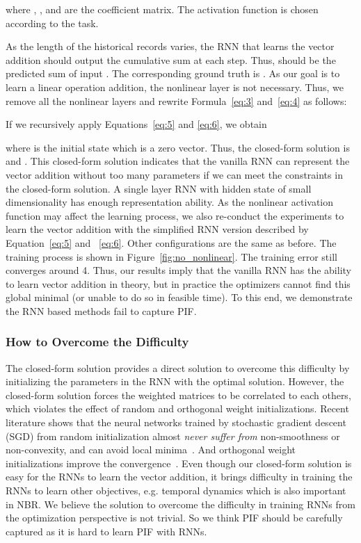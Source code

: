 \documentclass[sigconf]{acmart}
\begin{document}
where , , and  are the coefficient matrix. The activation function  is  chosen according to the task. 

As the length of the historical records varies, the RNN that learns the  vector addition should  output the cumulative sum at each step. Thus,  should be the predicted sum of input . The corresponding ground truth is .
As our goal is to learn a linear operation addition, the nonlinear layer is not necessary. Thus, we remove all the nonlinear layers and rewrite Formula~\ref{eq:3} and~\ref{eq:4} as follows:


If we recursively apply Equations~\ref{eq:5} and \ref{eq:6}, we obtain  


where  is the initial state which is a zero vector. Thus, the closed-form solution is  and . This closed-form solution indicates that the vanilla RNN can  represent the vector addition without too many parameters if we can meet the constraints in the closed-form solution. A single layer RNN with  hidden state of small dimensionality has  enough representation ability. As the  nonlinear activation function may affect the learning process, we also  re-conduct the  experiments to learn the vector addition with the simplified RNN version described by Equation~\ref{eq:5} and ~\ref{eq:6}. Other configurations are the same as before. The training process is shown in  Figure~\ref{fig:no_nonlinear}. The training error  still converges around 4.   Thus, our results imply that the vanilla RNN has the ability to learn vector addition in theory,  but in practice the optimizers  cannot find this global minimal (or unable to do so in feasible time). To this end, we demonstrate the RNN based methods fail to capture PIF.  



\subsubsection{How to Overcome the Difficulty}
The closed-form solution provides a direct solution to overcome this difficulty by initializing the parameters in the RNN with the optimal solution. However, the closed-form solution forces the  weighted matrices to be  correlated to each others,  which violates the effect of random and orthogonal weight initializations.  Recent literature shows that the neural networks trained by stochastic gradient descent (SGD) from random  initialization almost \textit{never suffer from} non-smoothness or non-convexity, and can avoid local  minima~\cite{goodfellow2014qualitatively}. And  orthogonal weight initializations improve the  convergence~\cite{hu2020provable}. Even though our closed-form solution is easy for the RNNs to learn  the vector addition, it brings  difficulty in training the RNNs to learn other objectives, e.g.  temporal dynamics which is also important in NBR.  We believe the solution to overcome the difficulty in training RNNs from the  optimization perspective is not trivial. So we think  PIF should be  carefully captured as it is hard to learn PIF with RNNs.  
\end{document}
